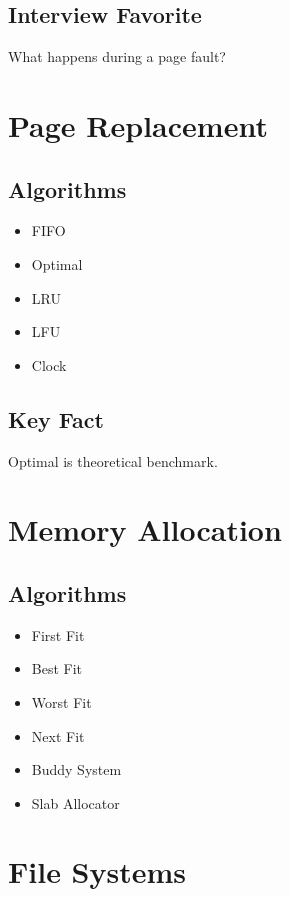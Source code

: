 \subsection*{Interview Favorite}

What happens during a page fault?

\section{Page Replacement}

\subsection*{Algorithms}

\begin{itemize}
\item FIFO
\item Optimal
\item LRU
\item LFU
\item Clock
\end{itemize}

\subsection*{Key Fact}

Optimal is theoretical benchmark.

\section{Memory Allocation}

\subsection*{Algorithms}

\begin{itemize}
\item First Fit
\item Best Fit
\item Worst Fit
\item Next Fit
\item Buddy System
\item Slab Allocator
\end{itemize}

\section{File Systems}

